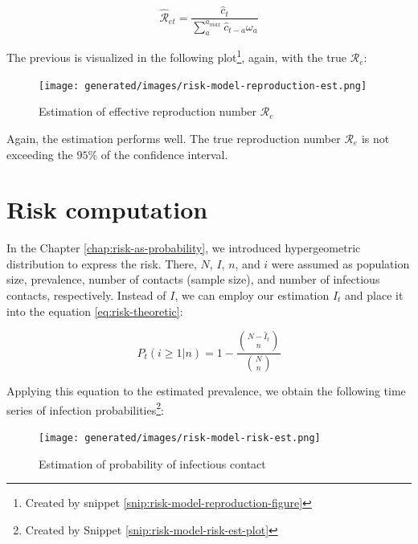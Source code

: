 \documentclass[
  digital, %
  oneside, %
  lof,     %
  lot,     %
]{fithesis4}
\begin{document}
\begin{equation}
  \hat{\mathcal{R}}_{et} = \frac{\hat{c}_t}{\sum_a^{a_{max}} \hat{c}_{t - a} \omega_a}
\end{equation}

The previous is visualized in the following plot\footnote{Created by snippet \ref{snip:risk-model-reproduction-figure}}, again, with the true $\mathcal{R}_e$:

\begin{figure}[H]
  \begin{center}
    \texttt{[image: generated/images/risk-model-reproduction-est.png]}
  \end{center}
  \caption{Estimation of effective reproduction number $\mathcal{R}_e$}
  \label{fig:risk-model-reproduction-est}
\end{figure}

Again, the estimation performs well.
The true reproduction number $\mathcal{R}_e$ is not exceeding the $95 \%$ of the confidence interval.


\section{Risk computation}

In the Chapter \ref{chap:risk-as-probability}, we introduced hypergeometric distribution to express the risk.
There, $N$, $I$, $n$, and $i$ were assumed as population size, prevalence, number of contacts (sample size), and number of infectious contacts, respectively.
Instead of $I$, we can employ our estimation $\hat{I}_t$ and place it into the equation \eqref{eq:risk-theoretic}:


\begin{equation}
  P_t(i \geq 1|n) = 1 - \frac{
    \binom{N - \hat{I}_t}{n}
  }{
    \binom{N}{n}
  }
\end{equation}

Applying this equation to the estimated prevalence, we obtain the following time series of infection probabilities\footnote{Created by Snippet \ref{snip:risk-model-risk-est-plot}}:

\begin{figure}[H]
  \begin{center}
    \texttt{[image: generated/images/risk-model-risk-est.png]}
  \end{center}
  \caption{Estimation of probability of infectious contact}
  \label{fig:risk-model-risk-est}
\end{figure}
\end{document}
